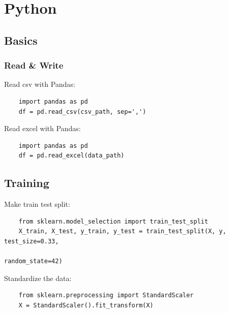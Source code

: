 \documentclass[12pt]{report}
\begin{document}
{
\tableofcontents
}
\pagebreak

\renewcommand{\theFancyVerbLine}{
  \sffamily\textcolor[rgb]{0.5,0.5,0.5}{\scriptsize\arabic{FancyVerbLine}}}

\chapter{Python}
    \section{Basics}
        \subsection{Read \& Write}
            Read csv with Pandas:
            \begin{verbatim}
    import pandas as pd
    df = pd.read_csv(csv_path, sep=',')
            \end{verbatim}
            
            Read excel with Pandas:
            \begin{verbatim}
    import pandas as pd
    df = pd.read_excel(data_path)
            \end{verbatim}
    \section{Training}
        Make train test split:
        \begin{verbatim}
    from sklearn.model_selection import train_test_split
    X_train, X_test, y_train, y_test = train_test_split(X, y, test_size=0.33,
                                                        random_state=42)
        \end{verbatim}
        
        Standardize the data:
        \begin{verbatim}
    from sklearn.preprocessing import StandardScaler
    X = StandardScaler().fit_transform(X)
        \end{verbatim}
        
\end{document}
